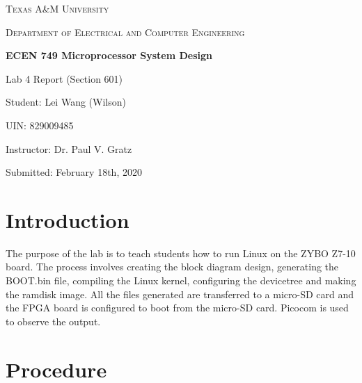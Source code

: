 \documentclass[11pt,letterpaper,titlepage]{article}
\begin{document}
\begin{titlepage}
  \centering
	{\scshape\large Texas A\&M University \par}
	\vspace{1cm}
	{\scshape\Large Department of Electrical and Computer Engineering \par}
	\vspace{4cm}
    \vspace{0.5cm}
	{\huge\bfseries ECEN 749 Microprocessor System Design\par}
	\vspace{4cm}
	{\Large Lab 4 Report (Section 601)\par}
	\vspace{1cm}
	{\Large Student: Lei Wang (Wilson)\par}
	\vspace{1cm}
	{\Large UIN: 829009485\par}
	\vspace{1cm}
	{\Large Instructor: Dr. Paul V. Gratz\par}
	\vspace{4cm}
	\vfill

	{\large Submitted: February 18th, 2020 \par}

\end{titlepage}

\newpage

\tableofcontents{}

\newpage

\part{Introduction}

The purpose of the lab is to teach students how to run Linux on the ZYBO Z7-10 board. The process involves creating the block diagram design, generating the BOOT.bin file, compiling the Linux kernel, configuring the devicetree and making the ramdisk image. All the files generated are transferred to a micro-SD card and the FPGA board is configured to boot from the micro-SD card. Picocom is used to observe the output.

\part{Procedure}
\end{document}

